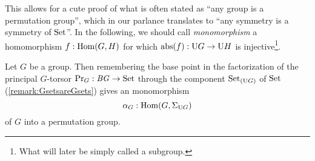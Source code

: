 This allows for a cute proof of what is often stated as ``any group is a permutation group'', which in our parlance translates to ``any symmetry is a symmetry of $\mathrm{Set}$''.
In the following, we should call {\em monomorphism} a homomorphism
$f:\Hom(G,H)$ for which $\mathrm{abs}(f):\mathrm{U} G\to\mathrm{U} H$ is
injective\footnote{What will later be simply called a subgroup.}.
\begin{lemma}
  \label{lem:allgpsarepermutationgps}Let $G$ be a group. Then
  remembering the base point in the factorization of the principal
  $G$-torsor $\mathrm{Pr}_{{G}}:\mathit{B}\mathit{G}\to\mathrm{Set}$ through the component
  ${{\mathrm{Set}}_{\left(\mathrm{U} G\right)}}$ of $\mathrm{Set}$ (\cf \cref{remark:GsetsareGsets})
  gives an monomorphism
  $$\alpha_G:\Hom(G,\Sigma_{\USym G})$$  
  of $G$ into a permutation group.
\end{lemma}
